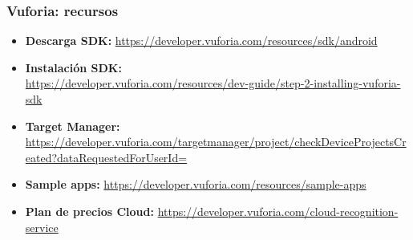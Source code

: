 \frame
{
\frametitle{Vuforia: recursos}
\begin{itemize}
\item \textbf{Descarga SDK:} \url{https://developer.vuforia.com/resources/sdk/android}
\item \textbf{Instalación SDK:} \\\url{https://developer.vuforia.com/resources/dev-guide/step-2-installing-vuforia-sdk}
\item \textbf{Target Manager:} \url{https://developer.vuforia.com/targetmanager/project/checkDeviceProjectsCreated?dataRequestedForUserId=}
\item \textbf{Sample apps:} \url{https://developer.vuforia.com/resources/sample-apps}
\item \textbf{Plan de precios Cloud:} \url{https://developer.vuforia.com/cloud-recognition-service}
\end{itemize}
}
